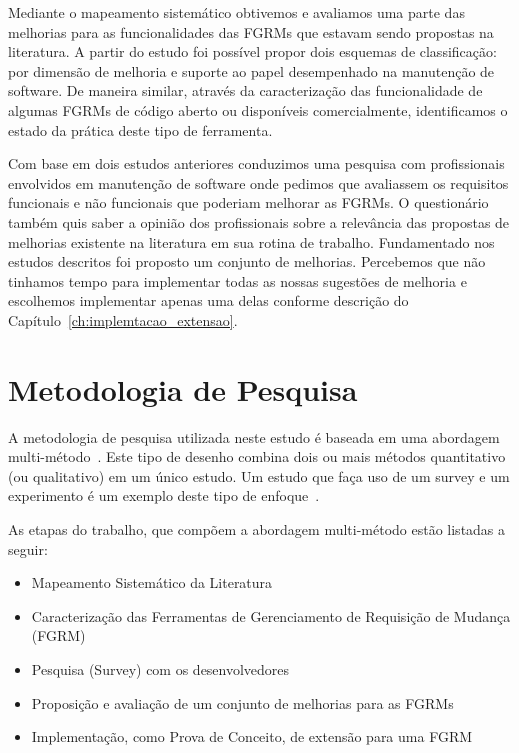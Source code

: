Mediante o mapeamento sistemático obtivemos e avaliamos uma parte das melhorias
para as funcionalidades das FGRMs que estavam sendo propostas na literatura. A
partir do estudo foi possível propor dois esquemas de classificação: por
dimensão de melhoria e suporte ao papel desempenhado na manutenção de software.
De maneira similar, através da caracterização das funcionalidade de algumas
FGRMs de código aberto ou disponíveis comercialmente, identificamos o estado da
prática deste tipo de ferramenta.

Com base em dois estudos anteriores conduzimos uma pesquisa com profissionais
envolvidos em manutenção de software onde pedimos que avaliassem os requisitos
funcionais e não funcionais que poderiam melhorar as FGRMs. O questionário
também quis saber a opinião dos profissionais sobre a relevância das propostas
de me\-lho\-ri\-as existente na literatura em sua rotina de trabalho.
Fundamentado nos estudos descritos foi proposto um conjunto de melhorias.
Percebemos que não tinhamos tempo para implementar todas as nossas sugestões de
melhoria e escolhemos implementar apenas uma delas conforme descrição do
Capítulo~\ref{ch:implemtacao_extensao}.

\section{Metodologia de Pesquisa}
\label{sec:intro-metodologia}

A metodologia de pesquisa utilizada neste estudo é baseada em uma abordagem
multi-método~\cite{hesse2010mixed}. Este tipo de desenho combina dois ou mais
métodos quantitativo (ou qualitativo) em um único estudo. Um estudo que faça uso
de um survey e um experimento é um exemplo deste tipo de
enfoque~\cite{hesse2010mixed}.


As etapas do trabalho, que compõem a abordagem multi-método estão listadas a
seguir:

\begin{itemize}[(i)]
	\item Mapeamento Sistemático da Literatura~\cite{Petersen2008}
	\item Caracterização das Ferramentas de Gerenciamento de Requisição de
		Mudança (FGRM)
	\item Pesquisa (Survey) com os
		desenvolvedores~\cite{wohlin2012experimentation}
	\item Proposição e avaliação de um conjunto de melhorias para as FGRMs
    \item Implementação, como Prova de Conceito, de extensão para uma FGRM
\end{itemize}

